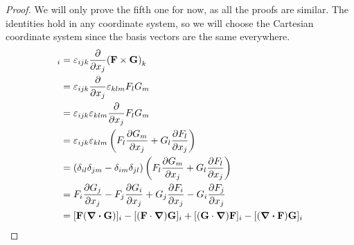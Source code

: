 \documentclass{article}
\begin{document}
\begin{proof}
    We will only prove the fifth one for now, as all the proofs are similar. The identities hold in any coordinate system, so we will choose the Cartesian coordinate system since the basis vectors are the same everywhere.
    \begin{align*}
        [\curl(\vb F \times \vb G)]_i & = \varepsilon_{ijk} \pdv{x_j} (\vb F \times \vb G)_k                                                            \\
                                      & = \varepsilon_{ijk} \pdv{x_j} \varepsilon_{klm} F_l G_m                                                         \\
                                      & = \varepsilon_{ijk} \varepsilon_{klm} \pdv{x_j} F_l G_m                                                         \\
                                      & = \varepsilon_{ijk} \varepsilon_{klm} \left( F_l \pdv{G_m}{x_j} + G_l \pdv{F_l}{x_j}  \right)                   \\
                                      & = (\delta_{il}\delta_{jm} - \delta_{im}\delta_{jl}) \left( F_l \pdv{G_m}{x_j} + G_l \pdv{F_l}{x_j} \right)      \\
                                      & = F_i \pdv{G_j}{x_j} - F_j \pdv{G_i}{x_j} + G_j \pdv{F_i}{x_j} - G_i \pdv{F_j}{x_j}                             \\
                                      & = [\vb F(\div{\vb G})]_i - [(\vb F \cdot \grad)\vb G]_i + [(\vb G \cdot \grad)\vb F]_i - [(\div{\vb F})\vb G]_i
    \end{align*}
\end{proof}
\end{document}
